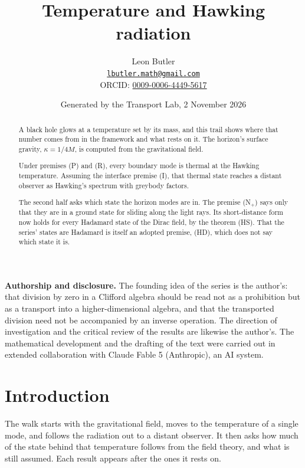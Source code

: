 \documentclass[11pt]{article}
\title{\bfseries Temperature and Hawking radiation}
\author{Leon Butler\\ \normalsize\href{mailto:lbutler.math@gmail.com}{\texttt{lbutler.math@gmail.com}}\\ \normalsize ORCID: \href{https://orcid.org/0009-0006-4449-5617}{0009-0006-4449-5617}}
\date{Generated by the Transport Lab, 2 November 2026}
\theoremstyle{definition}
\theoremstyle{plain}
\begin{document}
\maketitle
\begin{abstract}
\normalsize
A black hole glows at a temperature set by its mass, and this trail shows where that number comes from in the framework and what rests on it. The horizon's surface gravity, $\kappa = 1/4M$, is computed from the gravitational field.

Under premises (P) and (R), every boundary mode is thermal at the Hawking temperature. Assuming the interface premise (I), that thermal state reaches a distant observer as Hawking's spectrum with greybody factors.

The second half asks which state the horizon modes are in. The premise (N$_{+}$) says only that they are in a ground state for sliding along the light rays. Its short-distance form now holds for every Hadamard state of the Dirac field, by the theorem (HS). That the series' states are Hadamard is itself an adopted premise, (HD), which does not say which state it is.
\end{abstract}
\newpage
\noindent \textbf{Authorship and disclosure. }The founding idea of the series is the author's: that division by zero in a Clifford algebra should be read not as a prohibition but as a transport into a higher-dimensional algebra, and that the transported division need not be accompanied by an inverse operation. The direction of investigation and the critical review of the results are likewise the author's. The mathematical development and the drafting of the text were carried out in extended collaboration with Claude Fable 5 (Anthropic), an AI system.

\noindent{}
\newpage

\section*{Introduction}
The walk starts with the gravitational field, moves to the temperature of a single mode, and follows the radiation out to a distant observer. It then asks how much of the state behind that temperature follows from the field theory, and what is still assumed. Each result appears after the ones it rests on.
\end{document}

